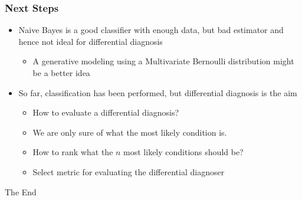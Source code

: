 \documentclass{beamer}
\begin{document}
\begin{frame}
\frametitle{Next Steps}
\begin{itemize}
	\item Naive Bayes is a good classifier with enough data, but bad estimator and hence not ideal for differential diagnosis
	\begin{itemize}
		\item A generative modeling using a Multivariate Bernoulli distribution might be a better idea
	\end{itemize}
	\item So far, classification has been performed, but differential diagnosis is the aim
	\begin{itemize}
		\item How to evaluate a differential diagnosis?
		\item We are only sure of what the most likely condition is.
		\item How to rank what the $n$ most likely conditions should be?
		\item Select metric for evaluating the differential diagnoser
	\end{itemize}
\end{itemize}
\end{frame}

\begin{frame}
\Huge{\centerline{The End}}
\end{frame}

\end{document}
